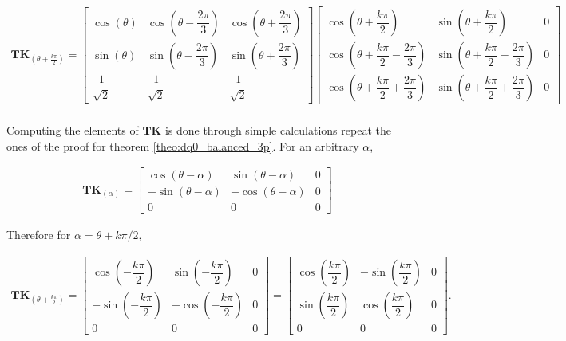 \small
\begin{align}
\mathbf{T}\mathbf{K}_{\left(\theta + \frac{k\pi}{2}\right)} = 
\left[\begin{array}{ccc}
\cos\left(\theta\right) & \cos\left(\theta - \dfrac{2\pi}{3}\right) & \cos\left(\theta + \dfrac{2\pi}{3}\right) \\[5mm]
\sin\left(\theta\right) & \sin\left(\theta - \dfrac{2\pi}{3}\right) & \sin\left(\theta + \dfrac{2\pi}{3}\right) \\[5mm]
\dfrac{1}{\sqrt{2}} & \dfrac{1}{\sqrt{2}} & \dfrac{1}{\sqrt{2}} 
\end{array}\right]
\left[\begin{array}{ccc}
\cos\left(\theta + \dfrac{k\pi}{2}\right)                  & \sin\left(\theta + \dfrac{k\pi}{2}\right)                   & 0 \\[5mm]
\cos\left(\theta + \dfrac{k\pi}{2}- \dfrac{2\pi}{3}\right) & \sin\left(\theta + \dfrac{k\pi}{2} - \dfrac{2\pi}{3}\right) & 0 \\[5mm] 
\cos\left(\theta + \dfrac{k\pi}{2}+ \dfrac{2\pi}{3}\right) & \sin\left(\theta + \dfrac{k\pi}{2} + \dfrac{2\pi}{3}\right) & 0 
\end{array}\right] \nonumber\\[5mm]
\end{align}
\normalsize

	Computing the elements of $\mathbf{TK}$ is done through simple calculations  repeat the ones of the proof for theorem \ref{theo:dq0_balanced_3p}. For an arbitrary $\alpha$,

\begin{align}
\mathbf{T}\mathbf{K}_{\left(\alpha\right)} = 
\left[\begin{array}{ccc}
 \cos\left(\theta-\alpha\right) &  \sin\left(\theta - \alpha\right) & 0\\[5mm]
-\sin\left(\theta-\alpha\right) & -\cos\left(\theta - \alpha\right) & 0\\[5mm]
0 & 0 & 0
\end{array}\right]
\end{align}

	Therefore for $\alpha = \theta + k\pi/2$,

\begin{align}
\mathbf{T}\mathbf{K}_{\left(\theta + \frac{k\pi}{2}\right)} = 
\left[\begin{array}{ccc}
 \cos\left(-\dfrac{k\pi}{2}\right) &  \sin\left(-\dfrac{k\pi}{2}\right) & 0\\[5mm]
-\sin\left(-\dfrac{k\pi}{2}\right) & -\cos\left(-\dfrac{k\pi}{2}\right) & 0\\[5mm]
0 & 0 & 0
\end{array}\right]
= 
\left[\begin{array}{ccc}
 \cos\left( \dfrac{k\pi}{2}\right) &  -\sin\left(\dfrac{k\pi}{2}\right) & 0\\[5mm]
 \sin\left( \dfrac{k\pi}{2}\right) &   \cos\left(\dfrac{k\pi}{2}\right) & 0\\[5mm]
0 & 0 & 0
\end{array}\right] .
\end{align}

